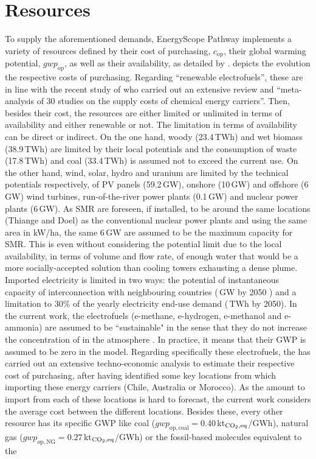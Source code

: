 \section{Resources}
\label{sec:cs:resources}
To supply the aforementioned demands, EnergyScope Pathway implements a variety of resources defined by their cost of purchasing, $\mathit{c}_{\mathrm{op}}$, their global warming potential, $\mathit{gwp}_{\mathrm{op}}$, as well as their 
availability, as detailed by \citet{limpens2024pathway}.  depicts the evolution the respective costs of purchasing. Regarding ``renewable electrofuels'', these are in line with the recent study of \citet{genge2023supply} who carried out an extensive review and ``meta-analysis\cite{grant2009typology,page2021prisma} of 30 studies on the supply costs of chemical energy carriers''. Then, besides their cost, the resources are either limited or unlimited in terms of availability and either renewable or not. The limitation in terms of availability can be direct or indirect. On the one hand, woody (23.4\,TWh) and wet biomass (38.9\,TWh) are limited by their local potentials and the consumption of waste (17.8\,TWh) and coal (33.4\,TWh) is assumed not to exceed the current use. On the other hand, wind, solar, hydro and uranium are limited by the technical potentials respectively, of \gls{PV} panels (59.2\,GW), onshore (10\,GW) and offshore (6\,GW) wind turbines, run-of-the-river power plants (0.1\,GW) and nuclear power plants (6\,GW). As \gls{SMR} are foreseen, if installed, to be around the same locations (\ie Thiange and Doel) as the conventional nuclear power plants and using the same area in kW/ha, the same 6\,GW are assumed to be the maximum capacity for \gls{SMR}. This is even without considering the potential limit due to the local availability, in terms of volume and flow rate, of enough water that would be a more socially-accepted solution than cooling towers exhausting a dense plume. Imported electricity is limited in two ways: the potential of instantaneous capacity of interconnection with neighbouring countries (\,GW by 2050 \cite{ELIA_2050}) and a limitation to 30\% of the yearly electricity end-use demand (\,TWh by 2050). In the current work, the electrofuels (\ie e-methane, e-hydrogen, e-methanol and e-ammonia) are assumed to be ``sustainable" in the sense that they do not increase the concentration of  in the atmosphere \cite{rixhon2021terminology}. In practice, it means that their \gls{GWP} is assumed to be zero in the model. Regarding specifically these electrofuels, the \citet{h2coalition} has carried out an extensive techno-economic analysis to estimate their respective cost of purchasing, after having identified some key locations from which importing these energy carriers (\eg Chile, Australia or Morocco). As the amount to import from each of these locations is hard to forecast, the current work considers the average cost between the different locations. Besides these, every other resource has its specific \gls{GWP} like coal ($\mathit{gwp}_{\mathrm{op,coal}}=0.40$\,kt$_{\ce{CO2},\text{eq}}$/GWh), natural gas ($\mathit{gwp}_{\mathrm{op,NG}}=0.27$\,kt$_{\ce{CO2},\text{eq}}$/GWh) or the fossil-based molecules equivalent to the 